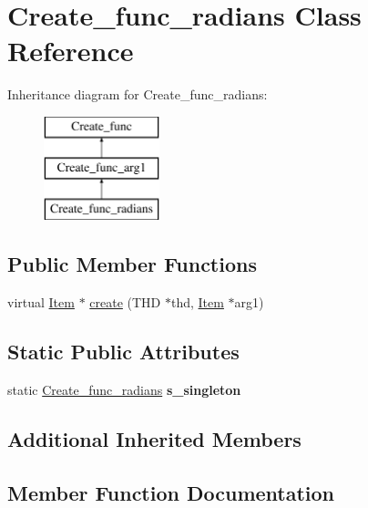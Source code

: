 \hypertarget{classCreate__func__radians}{}\section{Create\+\_\+func\+\_\+radians Class Reference}
\label{classCreate__func__radians}
Inheritance diagram for Create\+\_\+func\+\_\+radians\+:\begin{figure}[H]
\begin{center}
\leavevmode
\includegraphics[height=3.000000cm]{classCreate__func__radians}
\end{center}
\end{figure}
\subsection*{Public Member Functions}
\begin{DoxyCompactItemize}
\item 
virtual \mbox{\hyperlink{classItem}{Item}} $\ast$ \mbox{\hyperlink{classCreate__func__radians_a3d1d45713e5cebb71094c3163018b25c}{create}} (T\+HD $\ast$thd, \mbox{\hyperlink{classItem}{Item}} $\ast$arg1)
\end{DoxyCompactItemize}
\subsection*{Static Public Attributes}
\begin{DoxyCompactItemize}
\item 
\mbox{\label{classCreate__func__radians_a00c8a3b6d7e1e9956863635ff8900b03}} 
static \mbox{\hyperlink{classCreate__func__radians}{Create\+\_\+func\+\_\+radians}} {\bfseries s\+\_\+singleton}
\end{DoxyCompactItemize}
\subsection*{Additional Inherited Members}


\subsection{Member Function Documentation}
\mbox{\label{classCreate__func__radians_a3d1d45713e5cebb71094c3163018b25c}} 
